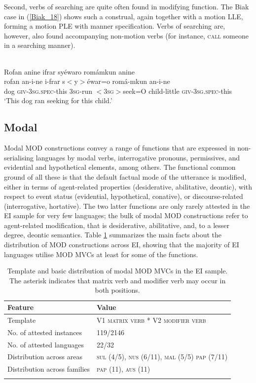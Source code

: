 Second, verbs of searching are quite often found in modifying function. The Biak case in (\ref{Biak_18}) shows such a construal, again together with a motion LLE, forming a motion PLE with manner specification. Verbs of searching are, however, also found accompanying non-motion verbs (for instance, \textsc{call} someone in a searching manner).

\ea \label{Biak_18}
\\
\glll Rofan anine ifrar syéwaro romámkun anine \\
rofan an-i-ne i-frar s$<$y$>$éwar=o romá-mkun an-i-ne \\
dog \textsc{giv}-3\textsc{sg}.\textsc{spec}-this 3\textsc{sg}-run $<$3\textsc{sg}$>$seek=O child-little \textsc{giv}-3\textsc{sg}.\textsc{spec}-this \\
\glft `This dog ran seeking for this child.'\\ 
\z

\subsection{Modal}\label{sec:modal}

Modal MOD constructions convey a range of functions that are expressed in non-serialising languages by modal verbs, interrogative pronouns, permissives, and evidential and hypothetical elements, among others. The functional common ground of all these is that the default factual mode of the utterance is modified, either in terms of agent-related properties (desiderative, abilitative, deontic), with respect to event status (evidential, hypothetical, conative), or discourse-related (interrogative, hortative). The two latter functions are only rarely attested in the EI sample for very few languages; the bulk of modal MOD constructions refer to agent-related modification, that is desiderative, abilitative, and, to a lesser degree, deontic semantics. Table \ref{table:modal} summarizes the main facts about the distribution of MOD constructions across EI, showing that the majority of EI languages utilise MOD MVCs at least for some of the functions.

\begin{table}
\begin{tabular}{ll}
\lsptoprule
Feature&Value\tabularnewline
\midrule
Template&V1 \textsc{matrix verb} * V2 \textsc{modifier verb}\tabularnewline
No. of attested instances& 119/2146 \tabularnewline
No. of attested languages& 22/32 \tabularnewline
Distribution across areas& \textsc{sul} (4/5), \textsc{nus} (6/11), \textsc{mal} (5/5) \textsc{pap} (7/11) \tabularnewline
Distribution across families& \textsc{pap} (11), \textsc{aus} (11) \tabularnewline
\lspbottomrule
\end{tabular}
\caption[Template and basic distribution of modal MOD MVCs]{Template and basic distribution of modal MOD MVCs in the EI sample. The asterisk indicates that matrix verb and modifier verb may occur in both positions.}
\label{table:modal}
\end{table}

